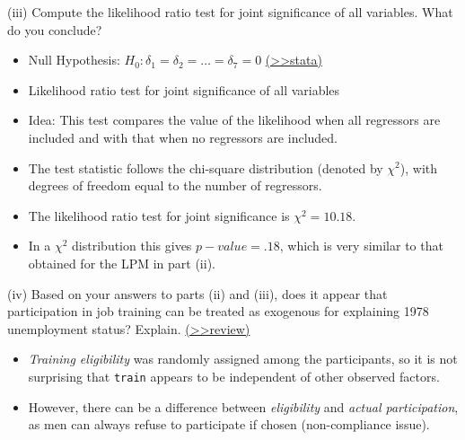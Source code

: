 \documentclass[
  10pt,
  ignorenonframetext,
]{beamer}
\providecommand{\tightlist}{%
  \setlength{\itemsep}{0pt}\setlength{\parskip}{0pt}}
\begin{document}
\begin{frame}{(iii) Compute the likelihood ratio test for joint
significance \quad of all variables. What do you conclude?}
\protect\hypertarget{iii-compute-the-likelihood-ratio-test-for-joint-significance-of-all-variables.-what-do-you-conclude}{}
\begin{itemize}
\item
  Null Hypothesis: \(H_0: \delta_1 = \delta_2 = \ldots = \delta_7 = 0\)
  \footnotesize \protect\hyperlink{PROBITtrain}{(\textgreater\textgreater stata)}
  \normalsize
\item
  Likelihood ratio test for joint significance of all variables
\item
  Idea: This test compares the value of the likelihood when all
  regressors are included and with that when no regressors are included.
\item
  The test statistic follows the chi-square distribution (denoted by
  \(\chi^2\)), with degrees of freedom equal to the number of
  regressors.
\item
  The likelihood ratio test for joint significance is
  \(\chi^2 = 10.18\).
\item
  In a \(\chi^2\) distribution this gives \(p-value = .18\), which is
  very similar to that obtained for the LPM in part (ii).
\end{itemize}
\end{frame}

\begin{frame}[fragile]{(iv) Based on your answers to parts (ii) and
(iii), does it appear that participation in job training can be treated
as exogenous for explaining 1978 unemployment status? Explain.}
\protect\hypertarget{Ex1-iv}{}
\footnotesize \protect\hyperlink{RA}{(\textgreater\textgreater review)}
\normalsize

\begin{itemize}
\tightlist
\item
  \emph{Training eligibility} was randomly assigned among the
  participants, so it is not surprising that \texttt{train} appears to
  be independent of other observed factors.
\end{itemize}

\vspace{0.8mm}

\begin{itemize}
\tightlist
\item
  However, there can be a difference between \emph{eligibility} and
  \emph{actual participation}, as men can always refuse to participate
  if chosen (non-compliance issue).
\end{itemize}
\end{frame}
\end{document}
